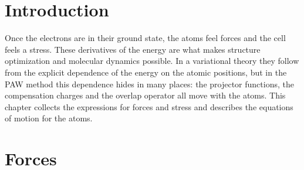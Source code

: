 \documentclass[11pt,a4paper,oneside]{book}
\begin{document}
\section{Introduction}

Once the electrons are in their ground state, the atoms feel forces and
the cell feels a stress. These derivatives of the energy are what makes
structure optimization and molecular dynamics possible. In a
variational theory they follow from the explicit dependence of the
energy on the atomic positions, but in the PAW method this dependence
hides in many places: the projector functions, the compensation charges
and the overlap operator all move with the atoms. This chapter collects
the expressions for forces and stress and describes the equations of
motion for the atoms.


\section{Forces}
\end{document}
